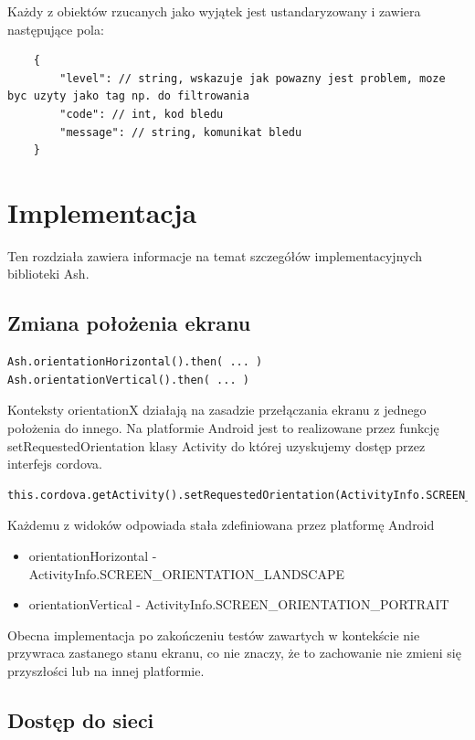 \documentclass[brudnopis]{xmgr}
\begin{document}
Każdy z obiektów rzucanych jako wyjątek jest ustandaryzowany i zawiera następujące pola: 

\begin{lstlisting}
	{
		"level": // string, wskazuje jak powazny jest problem, moze byc uzyty jako tag np. do filtrowania 
		"code": // int, kod bledu
		"message": // string, komunikat bledu 
	}
\end{lstlisting}

\chapter{Implementacja}

Ten rozdziała zawiera informacje na temat szczegółów implementacyjnych biblioteki Ash.

\section{Zmiana położenia ekranu}

\begin{lstlisting}
Ash.orientationHorizontal().then( ... ) 
Ash.orientationVertical().then( ... ) 
\end{lstlisting}

Konteksty orientationX działają na zasadzie przełączania ekranu z jednego położenia do innego.  Na platformie Android jest to realizowane przez funkcję setRequestedOrientation klasy Activity do której uzyskujemy dostęp przez interfejs cordova. 

\begin{lstlisting}
this.cordova.getActivity().setRequestedOrientation(ActivityInfo.SCREEN_ORIENTATION_LANDSCAPE);
\end{lstlisting}

Każdemu z widoków odpowiada stała zdefiniowana przez platformę Android
\begin{itemize}
  \item orientationHorizontal - ActivityInfo.SCREEN\_ORIENTATION\_LANDSCAPE
  \item orientationVertical - ActivityInfo.SCREEN\_ORIENTATION\_PORTRAIT
\end{itemize}

Obecna implementacja po zakończeniu testów zawartych w kontekście nie przywraca zastanego stanu ekranu, co nie znaczy, że to zachowanie nie zmieni się przyszłości lub na innej platformie.

\section{Dostęp do sieci}
\end{document}
